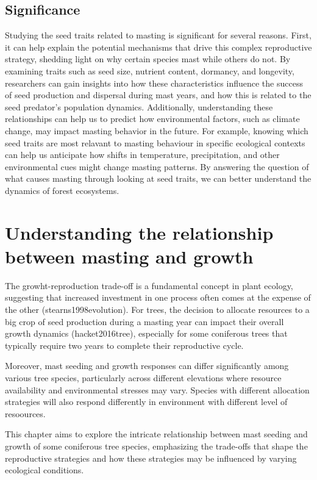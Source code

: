 \documentclass[11pt,letter]{article}
\begin{document}
\subsection{Significance} 
Studying the seed traits related to masting is significant for several reasons. First, it can help explain the potential mechanisms that drive this complex reproductive strategy, shedding light on why certain species mast while others do not. By examining traits such as seed size, nutrient content, dormancy, and longevity, researchers can gain insights into how these characteristics influence the success of seed production and dispersal during mast years, and how this is related to the seed predator's population dynamics.
Additionally, understanding these relationships can help us to predict how environmental factors, such as climate change, may impact masting behavior in the future. For example, knowing which seed traits are most relavant to masting behaviour in specific ecological contexts can help us anticipate how shifts in temperature, precipitation, and other environmental cues might change masting patterns. By answering the question of what causes masting through looking at seed traits, we can better understand the dynamics of forest ecosystems.

\section{Understanding the relationship between masting and growth}
The growht-reproduction trade-off is a fundamental concept in plant ecology, suggesting that increased investment in one process often comes at the expense of the other (stearns1998evolution). For trees, the decision to allocate resources to a big crop of seed production during a masting year can impact their overall growth dynamics (hacket2016tree), especially for some coniferous trees that typically require two years to complete their reproductive cycle.

Moreover, mast seeding and growth responses can differ significantly among various tree species, particularly across different elevations where resource availability and environmental stresses may vary. Species with different allocation strategies will also respond differently in environment with different level of resoources.

This chapter aims to explore the intricate relationship between mast seeding and growth of some coniferous tree species, emphasizing the trade-offs that shape the reproductive strategies and how these strategies may be influenced by varying ecological conditions.
\end{document}
